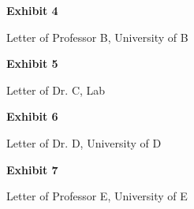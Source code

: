 \documentclass{article}
\begin{document}
 


\vspace*{\fill}
\begin{center}

{\LARGE \bf
Exhibit 4
}

\vspace{10\baselineskip}

{\large Letter of Professor B, University of B}

\end{center}
\vspace*{\fill}


% 



\vspace*{\fill}
\begin{center}

{\LARGE \bf
Exhibit 5
}

\vspace{10\baselineskip}

{\large  Letter of Dr. C, Lab}

\end{center}
\vspace*{\fill}


% 




\vspace*{\fill}
\begin{center}

{\LARGE \bf
Exhibit 6
}

\vspace{10\baselineskip}

{\large Letter of Dr. D, University of D}

\end{center}
\vspace*{\fill}

% 




\vspace*{\fill}
\begin{center}

{\LARGE \bf
Exhibit 7
}

\vspace{10\baselineskip}

{\large Letter of Professor E, University of E}

\end{center}
\vspace*{\fill}
\end{document}
